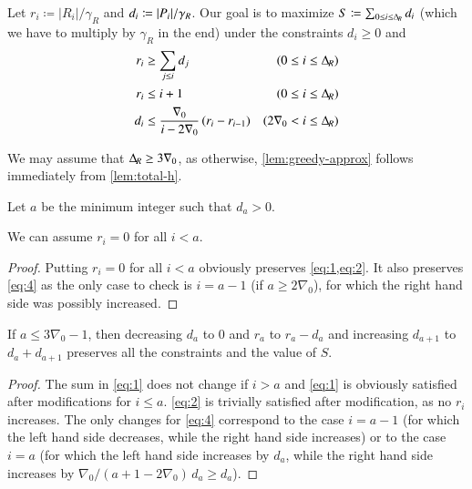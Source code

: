Let $r_i\coloneqq |R_i|/\gamma_R$ and $d_i\coloneqq |P_i|/\gamma_R$.
Our goal is to maximize $S\coloneqq\sum_{0\leq i\leq {\Delta_{\hspace{-1pt}R}}}d_i$ (which we have
to multiply by $\gamma_R$ in the end) under the constraints $d_i\geq 0$
and
\begin{align}
	r_i &\ge \sum_{j\le i} d_j&\text{($0\le i\le {\Delta_{\hspace{-1pt}R}}$)}\label{eq:1}\\
	r_i &\le	i+1&\text{($0\le i\le {\Delta_{\hspace{-1pt}R}}$)}\label{eq:2}\\
	d_{i}&\leq \frac{\nabla_0 }{i-2\nabla_0 }\,(r_{i}-r_{i-1})&\text{($2\nabla_0 < i\le {\Delta_{\hspace{-1pt}R}}$)}\label{eq:4}
\end{align}

We may assume that ${\Delta_{\hspace{-1pt}R}}\geq 3\nabla_0$, as otherwise,
\cref{lem:greedy-approx} follows immediately from \cref{lem:total-h}.

\smallskip
Let $a$ be the minimum integer such that $d_a>0$.

\begin{lemma}
	We can assume $r_i=0$ for all $i<a$.
\end{lemma}
\begin{proof}
	Putting $r_i=0$ for all $i<a$ obviously preserves \cref{eq:1,eq:2}. It also preserves \cref{eq:4} as the only case
	to check is $i=a-1$ (if $a\ge 2\nabla_0 $), for which the right hand side was possibly increased.
\end{proof}

\begin{lemma}
	If $a\le 3\nabla_0 -1$, then decreasing $d_a$ to $0$ and $r_a$ to $r_a-d_a$ and increasing $d_{a+1}$ to $d_a+d_{a+1}$ preserves  all the constraints and the value of $S$.
\end{lemma}
\begin{proof}
	The sum in \cref{eq:1} does not change if $i>a$ and \cref{eq:1} is obviously satisfied after modifications for $i\le a$.
	\cref{eq:2} is trivially satisfied after modification, as no $r_i$ increases.
	The only changes for \cref{eq:4} correspond to the case $i=a-1$ (for which the left hand side decreases,  while the right hand side increases) or to the case $i=a$ (for which the left hand side increases by $d_a$,  while the right hand side increases by $\nabla_0 /(a+1-2\nabla_0 )\,d_a\ge d_a$).
\end{proof}

